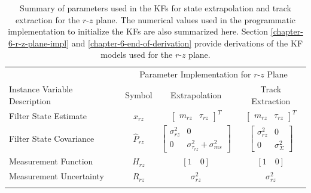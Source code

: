\begin{table}[H]
\caption{Summary of parameters used in the KFs for state extrapolation and track extraction for the $r$-$z$ plane. The numerical values used in the programmatic
implementation to initialize the KFs are also summarized here. Section \ref{chapter-6-r-z-plane-impl} and \ref{chapter-6-end-of-derivation} provide derivations of the KF models used for the $r$-$z$ plane.}

\begin{center}
\begin{tabular}{lccc}
\toprule

& \multicolumn{3}{c}{Parameter Implementation for $r$-$z$ Plane} \\
Instance Variable Description & Symbol  & Extrapolation  & Track Extraction  \\
\hline
\rule{0pt}{3ex}%


Filter State Estimate
& $\hat{x}_{rz}$
& $\begin{bmatrix} m_{rz} & \tau_{rz} \end{bmatrix}^{T}$
& $\begin{bmatrix} m_{rz} & \tau_{rz} \end{bmatrix}^{T}$
\\
\rule{0pt}{4ex}%

Filter State Covariance
& $\hat{P}_{rz}$
& $\begin{bmatrix} \sigma_{rz}^2 & 0 \\ 0 & \sigma_{\tau_{rz}}^2 + \sigma_{ms}^2\end{bmatrix}$
& $\begin{bmatrix} \sigma_{rz}^2 & 0 \\ 0 & \sigma_{\Sigma}^2\end{bmatrix}$
\\
\rule{0pt}{4ex}%


Measurement Function
& $\hat{H}_{rz}$ 
& $[1 \quad 0]$
& $[1 \quad 0]$
\\
\rule{0pt}{3ex}%

Measurement Uncertainty
& $\hat{R}_{rz}$ 
& $\sigma_{rz}^2$
& $\sigma_{rz}^2$
\\
\rule{0pt}{3ex}%


\end{tabular}
\end{center}
\end{table}
